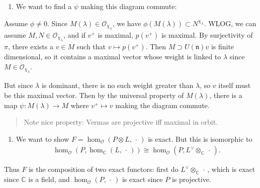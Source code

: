 \documentclass[11pt]{scrartcl}
\theoremstyle{definition}
\theoremstyle{theorem}
\theoremstyle{proof}
\newenvironment{proof}
{\pushQED{$\qed$}\pf}
{\par\popQED\endpf}
\theoremstyle{definition}
\theoremstyle{break}
\theoremstyle{problem}
\providecommand{\tightlist}{%
  \setlength{\itemsep}{0pt}\setlength{\parskip}{0pt}}
\newcommand{\CC}[0]{{\mathbb{C}}}
\newcommand{\dual}[0]{^\vee}
\newcommand{\lien}[0]{{\mathfrak{n}}}
\newcommand{\OO}[0]{{\mathcal{O}}}
\newcommand{\tensor}[0]{\otimes}
\newcommand{\wait}[0]{{\,\cdot\,}}
\renewcommand{\qed}[0]{\hfill\blacksquare}
\renewcommand{\to}[0]{\longrightarrow}
\begin{document}
\begin{proof}

\begin{enumerate}
\def\labelenumi{\alph{enumi}.}
\tightlist
\item
  We want to find a \(\psi\) making this diagram commute:

  \begin{center}
    \end{center}
\end{enumerate}

Assume \(\phi \neq 0\). Since \(M(\lambda) \in \OO_{\chi_\lambda}\), we
have \(\phi(M(\lambda)) \subset N^{\chi_\lambda}\). WLOG, we can assume
\(M, N \in \OO_{\chi_\lambda}\), and if \(v^+\) is maximal, \(p(v^+)\)
is maximal. By surjectivity of \(\pi\), there exists a \(v\in M\) such
that \(v \mapsto p(v^+)\). Then \(M \supset U(\lien) v\) is finite
dimensional, so it contains a maximal vector whose weight is linked to
\(\lambda\) since \(M\in \OO_{\chi_\lambda}\).

But since \(\lambda\) is dominant, there is no such weight greater than
\(\lambda\), so \(v\) itself must be this maximal vector. Then by the
universal property of \(M(\lambda)\), there is a map
\(\psi: M(\lambda) \to M\) where \(v^+ \mapsto v\) making the diagram
commute.

\begin{quote}
Note nice property: Vermas are projective iff maximal in orbit.
\end{quote}

\begin{enumerate}
\def\labelenumi{\alph{enumi}.}
\setcounter{enumi}{1}
\tightlist
\item
  We want to show \(F = \hom_\OO(P\tensor L, \wait)\) is exact. But this
  is isomorphic to
  \begin{align*}\hom_\OO(P, \hom_\CC(L, \wait)) \cong \hom_\OO(P, L\dual \tensor_\CC \wait).\end{align*}
\end{enumerate}

Thus \(F\) is the composition of two exact functors: first do
\(L\dual \tensor_\CC \wait\), which is exact since \(\CC\) is a field,
and \(\hom_\OO(P,\wait)\) is exact since \(P\) is projective.\end{proof}
\end{document}
